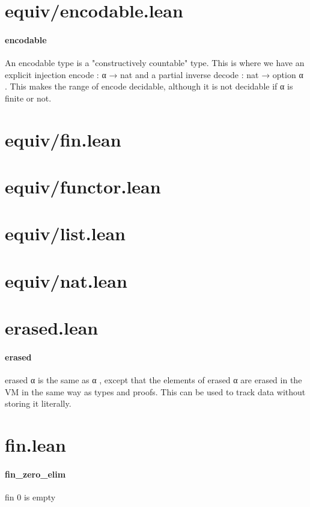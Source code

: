 \documentclass{article}
\begin{document}
\section{equiv/encodable.lean}\paragraph{encodable}
\par
An encodable type is a "constructively countable" type. This is where
we have an explicit injection 
\colorbox[RGB]{253,246,227}{{{{\color[RGB]{101, 123, 131} encode : α  }}}{{{\color[RGB]{133, 153, 0} → }}}{{{\color[RGB]{101, 123, 131}  nat }}}} and a partial inverse
\colorbox[RGB]{253,246,227}{{{{\color[RGB]{101, 123, 131} decode : nat  }}}{{{\color[RGB]{133, 153, 0} → }}}{{{\color[RGB]{101, 123, 131}  option α }}}}. This makes the range of 
\colorbox[RGB]{253,246,227}{{{{\color[RGB]{101, 123, 131} encode }}}} decidable,
although it is not decidable if 
\colorbox[RGB]{253,246,227}{{{{\color[RGB]{101, 123, 131} α }}}} is finite or not.
\section{equiv/fin.lean}\section{equiv/functor.lean}\section{equiv/list.lean}\section{equiv/nat.lean}\section{erased.lean}\paragraph{erased}
\par
\colorbox[RGB]{253,246,227}{{{{\color[RGB]{101, 123, 131} erased α }}}} is the same as 
\colorbox[RGB]{253,246,227}{{{{\color[RGB]{101, 123, 131} α }}}}, except that the elements
of 
\colorbox[RGB]{253,246,227}{{{{\color[RGB]{101, 123, 131} erased α }}}} are erased in the VM in the same way as types
and proofs. This can be used to track data without storing it
literally.
\section{fin.lean}\paragraph{fin\_zero\_elim}
\par
\colorbox[RGB]{253,246,227}{{{{\color[RGB]{101, 123, 131} fin  }}}{{{\color[RGB]{108, 113, 196} 0 }}}} is empty
\end{document}
